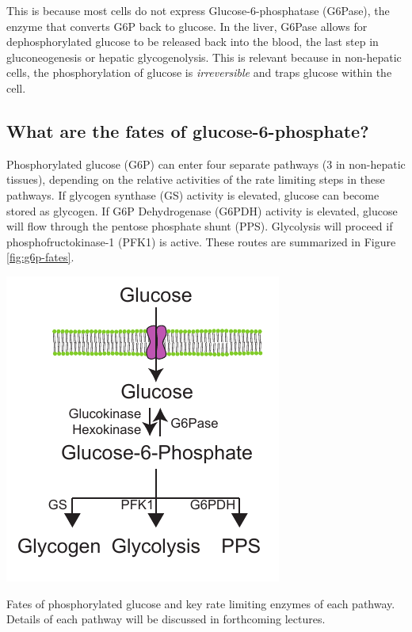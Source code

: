 \documentclass{tufte-handout}
\begin{document}
  This is because most cells do not express Glucose-6-phosphatase (G6Pase), the enzyme that converts G6P back to glucose.  In the liver, G6Pase allows for dephosphorylated glucose to be released back into the blood, the last step in gluconeogenesis or hepatic glycogenolysis.  This is relevant because in non-hepatic cells, the phosphorylation of glucose is \emph{irreversible} and traps glucose within the cell.

\subsection{What are the fates of glucose-6-phosphate?}

Phosphorylated glucose (G6P) can enter four separate pathways (3 in non-hepatic tissues), depending on the relative activities of the rate limiting steps in these pathways.  If glycogen synthase (GS) activity is elevated, glucose can become stored as glycogen.  If G6P Dehydrogenase (G6PDH) activity is elevated, glucose will flow through the pentose phosphate shunt (PPS).  Glycolysis will proceed if phosphofructokinase-1 (PFK1) is active.  These routes are summarized in Figure \ref{fig:g6p-fates}.

\begin{marginfigure}
\includegraphics{figures/g6p-fates.pdf}
\caption{Fates of phosphorylated glucose and key rate limiting enzymes of each pathway.  Details of each pathway will be discussed in forthcoming lectures.}
\label{fig:g6p-fates}
\end{marginfigure}
\end{document}
